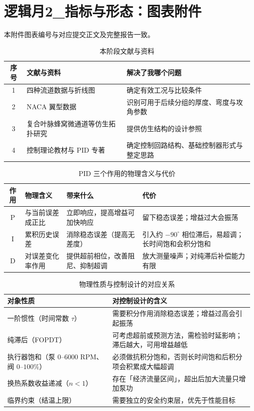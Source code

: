 \documentclass[stage2,fontset=fandol]{ydzjreport}
\begin{document}
\section*{逻辑月2\_指标与形态：图表附件}
本附件图表编号与对应提交正文及完整报告一致。\par\clearpage
\setcounter{table}{0}
\begin{table}[H]
\centering
\caption{本阶段文献与资料}
\label{tab:lit}
\begin{tabularx}{\textwidth}{@{}c Y Y@{}}
\toprule
{} 序号 & 文献与资料 & 解决了我哪个问题 \\
 & 四种流道数据与折线图 & 确定有效工况与比较条件 \\
2 & NACA 翼型数据 & 识别可用于后续分组的厚度、弯度与攻角参数 \\
3 & 复合叶脉蜂窝微通道等仿生拓扑研究 & 提供仿生结构的设计参照 \\
4 & 控制理论教材与 PID 专著\cite{hushousong,astrom,franklin,ogata} & 确定控制回路结构、基础控制器形式与整定思路 \\
\bottomrule
\end{tabularx}
\end{table}
\clearpage
\setcounter{table}{1}
\begin{table}[H]
		\centering
		\caption{PID 三个作用的物理含义与代价}
		\label{tab:pid}
		\begin{tabularx}{\textwidth}{@{}c Y Y Y@{}}
			\toprule
{} 作用 & 物理含义 & 带来什么 & 代价 \\
			\midrule
			P & 与当前误差成正比 & 立即响应，提高增益可加快响应 & 留下稳态误差；增益过大会振荡 \\
			I & 累积历史误差 & 消除稳态误差（提高无差度） & 引入约 $-90^\circ$ 相位滞后，易超调；长时间饱和会积分饱和 \\
			D & 对误差变化率作用 & 提供超前相位，改善阻尼、抑制超调 & 放大测量噪声；对纯滞后补偿能力有限 \\
			\bottomrule
		\end{tabularx}
	\end{table}
\clearpage
\setcounter{table}{2}
\begin{table}[H]
		\centering
		\caption{物理性质与控制设计的对应关系}
		\label{tab:physics-control}
		\begin{tabularx}{\textwidth}{@{}Y Y@{}}
			\toprule
{} 对象性质 & 对控制设计的含义 \\
			\midrule
			一阶惯性（时间常数 $\tau$） & 需要积分作用消除稳态误差；增益过高会引起振荡 \\
			纯滞后（FOPDT） & 可考虑超前或预测方法，需检验时延影响；滞后越大，可用增益越低 \\
			执行器饱和（泵 $0$--$6000$ RPM、阀 $0$--$100\%$） & 必须做抗积分饱和，否则长时间饱和后积分项会积累成大幅超调 \\
			换热系数收益递减（$n<1$） & 存在「经济流量区间」，超出后加大流量只增加泵功 \\
			临界约束（结温上限） & 需要独立的安全约束层，优先于性能目标 \\
			\bottomrule
		\end{tabularx}
	\end{table}
\end{document}
